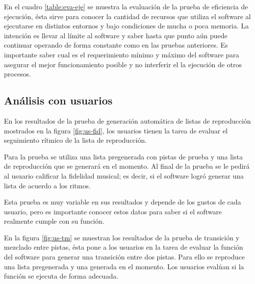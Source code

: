 \noindent En el cuadro \ref{table:eva-eje} se muestra la evaluaci\'on de la prueba de eficiencia de ejecuci\'on, \'esta sirve para conocer la cantidad de recursos que utiliza el software al ejecutarse en distintos entornos y bajo condiciones de mucha o poca memoria. La intenci\'on es llevar al l\'imite al software y saber hasta que punto a\'un puede continuar operando de forma constante como en las pruebas anteriores. Es importante saber cual es el requerimiento m\'inimo y m\'aximo del software para asegurar el mejor funcionamiento posible y no interferir el la ejecuci\'on de otros procesos.

\subsection{An\'alisis con usuarios}

En los resultados de la prueba de generaci\'on autom\'atica de listas de reproducci\'on mostrados en la figura \ref{fig:us-fid}, los usuarios tienen la tarea de evaluar el seguimiento r\'itmico de la lista de reproducci\'on. 

\noindent Para la prueba se utiliza una lista pregenerada con pistas de prueba y una lista de reproducci\'on que se generar\'a en el momento. Al final de la prueba se le pedir\'a al usuario calificar la fidelidad musical; es decir, si el software logr\'o generar una lista de acuerdo a los ritmos.

\noindent Esta prueba es muy variable en sus resultados y depende de los gustos de cada usuario, pero es importante conocer estos datos para saber si el software realmente cumple con su funci\'on.

\noindent En la figura \ref{fig:us-tm} se muestran los resultados de la prueba de transici\'on y mezclado entre pistas, \'esta pone a los usuarios en la tarea de evaluar la funci\'on del software para generar una transici\'on entre dos pistas. Para ello se reproduce una lista pregenerada y una generada en el momento. Los usuarios eval\'uan si la funci\'on se ejecuta de forma adecuada.


